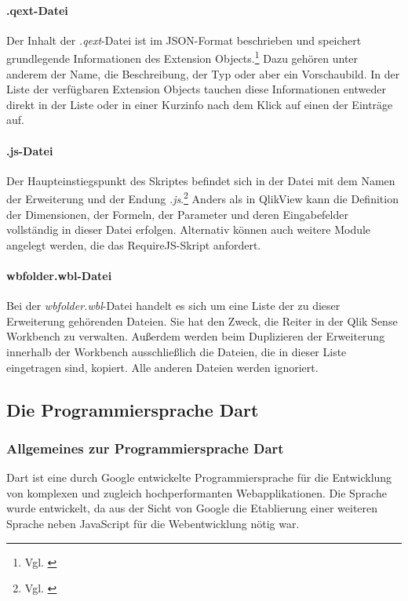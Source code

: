 \paragraph{.qext-Datei}

Der Inhalt der \textit{.qext}-Datei ist im JSON-Format beschrieben und speichert grundlegende Informationen des Extension Objects.\footnote{Vgl. \cite{QlikTipsExtensionsInQlikSense}} Dazu gehören unter anderem der Name, die Beschreibung, der Typ oder aber ein Vorschaubild. In der Liste der verfügbaren Extension Objects tauchen diese Informationen entweder direkt in der Liste oder in einer Kurzinfo nach dem Klick auf einen der Einträge auf.

\paragraph{.js-Datei}

Der Haupteinstiegspunkt des Skriptes befindet sich in der Datei mit dem Namen der Erweiterung und der Endung \textit{.js}.\footnote{Vgl. \cite{QlikTipsExtensionsInQlikSense}} Anders als in QlikView kann die Definition der Dimensionen, der Formeln, der Parameter und deren Eingabefelder vollständig in dieser Datei erfolgen. Alternativ können auch weitere Module angelegt werden, die das RequireJS-Skript anfordert.

\paragraph{wbfolder.wbl-Datei}


Bei der \textit{wbfolder.wbl}-Datei handelt es sich um eine Liste der zu dieser Erweiterung gehörenden Dateien. Sie hat den Zweck, die Reiter in der Qlik Sense Workbench zu verwalten. Außerdem werden beim Duplizieren der Erweiterung innerhalb der Workbench ausschließlich die Dateien, die in dieser Liste eingetragen sind, kopiert. Alle anderen Dateien werden ignoriert.


\subsection{Die Programmiersprache Dart}




\subsubsection{Allgemeines zur Programmiersprache Dart}

Dart ist eine durch Google entwickelte Programmiersprache für die Entwicklung von komplexen und zugleich hochperformanten Webapplikationen. Die Sprache wurde entwickelt, da aus der Sicht von Google die Etablierung einer weiteren Sprache neben JavaScript für die Webentwicklung nötig war.

